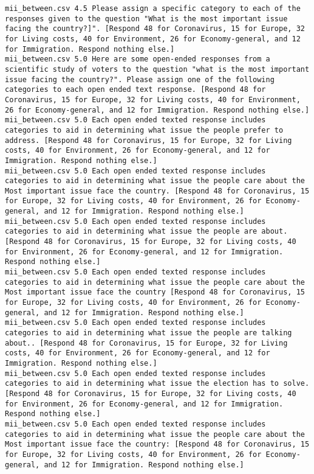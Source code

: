 \begin{lstlisting}[label=lst:promptvariants]
mii_between.csv	4.5	Please assign a specific category to each of the responses given to the question "What is the most important issue facing the country?]". [Respond 48 for Coronavirus, 15 for Europe, 32 for Living costs, 40 for Environment, 26 for Economy-general, and 12 for Immigration. Respond nothing else.]
mii_between.csv	5.0	Here are some open-ended responses from a scientific study of voters to the question "what is the most important issue facing the country?". Please assign one of the following categories to each open ended text response. [Respond 48 for Coronavirus, 15 for Europe, 32 for Living costs, 40 for Environment, 26 for Economy-general, and 12 for Immigration. Respond nothing else.]
mii_between.csv	5.0	Each open ended texted response includes categories to aid in determining what issue the people prefer to address. [Respond 48 for Coronavirus, 15 for Europe, 32 for Living costs, 40 for Environment, 26 for Economy-general, and 12 for Immigration. Respond nothing else.]
mii_between.csv	5.0	Each open ended texted response includes categories to aid in determining what issue the people care about the Most important issue face the country. [Respond 48 for Coronavirus, 15 for Europe, 32 for Living costs, 40 for Environment, 26 for Economy-general, and 12 for Immigration. Respond nothing else.]
mii_between.csv	5.0	Each open ended texted response includes categories to aid in determining what issue the people are about. [Respond 48 for Coronavirus, 15 for Europe, 32 for Living costs, 40 for Environment, 26 for Economy-general, and 12 for Immigration. Respond nothing else.]
mii_between.csv	5.0	Each open ended texted response includes categories to aid in determining what issue the people care about the Most important issue face the country [Respond 48 for Coronavirus, 15 for Europe, 32 for Living costs, 40 for Environment, 26 for Economy-general, and 12 for Immigration. Respond nothing else.]
mii_between.csv	5.0	Each open ended texted response includes categories to aid in determining what issue the people are talking about.. [Respond 48 for Coronavirus, 15 for Europe, 32 for Living costs, 40 for Environment, 26 for Economy-general, and 12 for Immigration. Respond nothing else.]
mii_between.csv	5.0	Each open ended texted response includes categories to aid in determining what issue the election has to solve. [Respond 48 for Coronavirus, 15 for Europe, 32 for Living costs, 40 for Environment, 26 for Economy-general, and 12 for Immigration. Respond nothing else.]
mii_between.csv	5.0	Each open ended texted response includes categories to aid in determining what issue the people care about the Most important issue face the country: [Respond 48 for Coronavirus, 15 for Europe, 32 for Living costs, 40 for Environment, 26 for Economy-general, and 12 for Immigration. Respond nothing else.]

\end{lstlisting}
